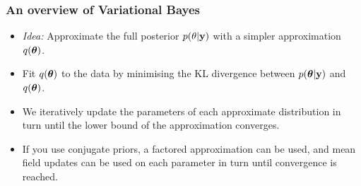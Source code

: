 \documentclass{beamer}
\begin{document}
\begin{frame}
	\frametitle{An overview of Variational Bayes}
	\begin{itemize}
		\item \emph{Idea:} Approximate the full posterior $p(\theta|{\bf y})$ with a simpler approximation $q({\boldsymbol \theta})$.
		      		      		      		      		      		      
		\item Fit $q({\boldsymbol \theta})$ to the data by minimising the KL divergence between $p({\boldsymbol \theta}|{\bf y})$ and $q({\boldsymbol \theta})$.
		      		      		      		      		      		      
		\item We iteratively update the parameters of each approximate distribution
					in turn until the lower bound of the approximation converges.

		      		      		      		      		      		      
		      		      		      		      		      		      
		\item If you use conjugate priors, a factored approximation can be used, and mean field updates can be used on
		      each parameter in turn until convergence is reached.
	\end{itemize}
\end{frame}

						
\end{document}
